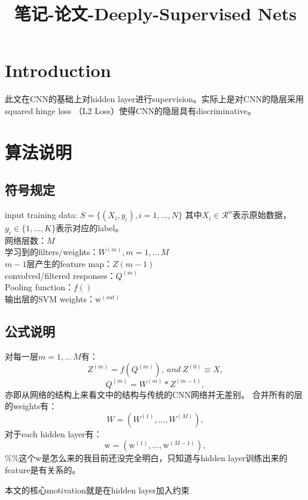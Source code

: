 \documentclass{article}
\begin{document}
\begin{CJK}{UTF8}{gbsn}

\title{笔记-论文-Deeply-Supervised Nets}
\maketitle
\section{Introduction}
此文在CNN的基础上对hidden layer进行supervision。实际上是对CNN的隐层采用squared hinge loss （L2 Loss）使得CNN的隐层具有discriminative。
\section{算法说明}
\subsection{符号规定}
input training data: 
$S=\{(X_i,y_i),i=1,\dots,N\}$ 其中$X_i\in\mathcal{R}^n$表示原始数据，$y_i\in\{1,\dots,K\}$表示对应的label。\\
网络层数：$M$ \\
学习到的filters/weights：$W^{(m)},m=1,\dots\,M$ \\
$m-1$层产生的feature map：$Z{(m-1)}$ \\
convolved/filtered responses：$Q^{(m)}$ \\
Pooling function：$f()$ \\
输出层的SVM weights：$\mathrm{w}^{(out)}$
\subsection{公式说明}
对每一层$m=1,\dots\,M$有：
\begin{equation} Z^{(m)}=f(Q^{(m)}),~and~Z^{(0)}\equiv X, \end{equation}
\begin{equation} Q^{(m)}=W^{(m)}\ast Z^{(m-1)}, \end{equation}
亦即从网络的结构上来看文中的结构与传统的CNN网络并无差别。
合并所有的层的weights有：
$$W=(W^{(1)},\dots,W^{(M)}),$$
对于each hidden layer有：
$$\mathrm{w}=(\mathrm{w}^{(1)},\dots,\mathrm{w}^{(M-1)}),$$
{\color{red}\%\%}这个w是怎么来的我目前还没完全明白，只知道与hidden layer训练出来的feature是有关系的。

{\color{red}本文的核心motivation就是在hidden layer加入约束}



\end{CJK}
\end{document}
